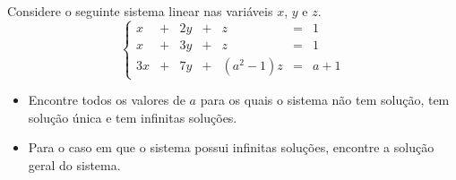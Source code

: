 \begin{problem}
Considere o seguinte sistema linear nas variáveis $x$, $y$ e $z$.
$$\left\{\begin{array}{rrrrrrr}
  x & + & 2y & + &        z & = &   1 \\
  x & + & 3y & + &        z & = &   1 \\
 3x & + & 7y & + & (a^2-1)z & = & a+1 \end{array}\right. $$
\begin{itemize}
\item[(a)] Encontre todos os valores de $a$ para os quais o sistema não tem solução, tem solução única e tem infinitas soluções.
\item[(b)] Para o caso em que o sistema possui infinitas soluções, encontre a solução geral do sistema.
\end{itemize}
\end{problem}
